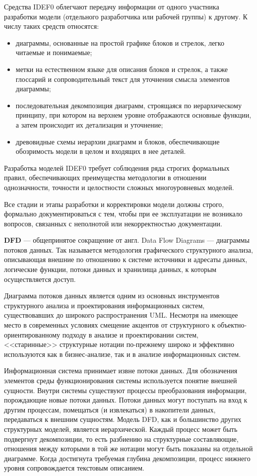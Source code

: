 Средства IDEF0 облегчают передачу информации от одного
участника разработки модели (отдельного разработчика или рабочей группы)
к другому. К числу таких средств относятся:
\begin{itemize}
  \item диаграммы, основанные на простой графике блоков и стрелок, легко
  читаемые и понимаемые;
  \item метки на естественном языке для описания блоков и стрелок, а также
  глоссарий и сопроводительный текст для уточнения смысла
  элементов диаграммы;
  \item последовательная декомпозиция диаграмм, строящаяся по
  иерархическому принципу, при котором на верхнем уровне
  отображаются основные функции, а затем происходит их
  детализация и уточнение;
  \item древовидные схемы иерархии диаграмм и блоков, обеспечивающие
  обозримость модели в целом и входящих в нее деталей.
\end{itemize}

Разработка моделей IDEF0 требует соблюдения
ряда строгих формальных правил, обеспечивающих преимущества
методологии в отношении однозначности, точности и целостности сложных
многоуровневых моделей.

Все стадии и этапы разработки и корректировки
модели должны строго, формально документироваться с тем, чтобы при ее
эксплуатации не возникало вопросов, связанных с неполнотой или
некорректностью документации.

\textbf{DFD} --- общепринятое сокращение от англ. Data Flow Diagrams ---
диаграммы потоков данных. Так называется методология графического
структурного анализа, описывающая внешние по отношению к системе
источники и адресаты данных, логические функции, потоки данных и
хранилища данных, к которым осуществляется доступ.

Диаграмма потоков данных является одним из
основных инструментов структурного анализа и проектирования
информационных систем, существовавших до широкого распространения
UML.
Несмотря на имеющее место в современных условиях смещение
акцентов от структурного к объектно-ориентированному подходу в анализе и
проектировании систем, <<старинные>> структурные нотации по-прежнему
широко и эффективно используются как в бизнес-анализе, так и в анализе
информационных систем.

Информационная система принимает извне потоки данных. Для
обозначения элементов среды функционирования системы используется
понятие внешней сущности. Внутри системы существуют процессы
преобразования информации, порождающие новые потоки данных.
Потоки данных могут поступать на вход к другим процессам, помещаться (и
извлекаться) в накопители данных, передаваться к внешним сущностям.
Модель DFD, как и большинство других структурных моделей, является
иерархической. Каждый процесс может быть подвергнут
декомпозиции, то есть разбиению на структурные составляющие, отношения
между которыми в той же нотации могут быть показаны на отдельной
диаграмме. Когда достигнута требуемая глубина декомпозиции, процесс
нижнего уровня сопровождается текстовым описанием.

